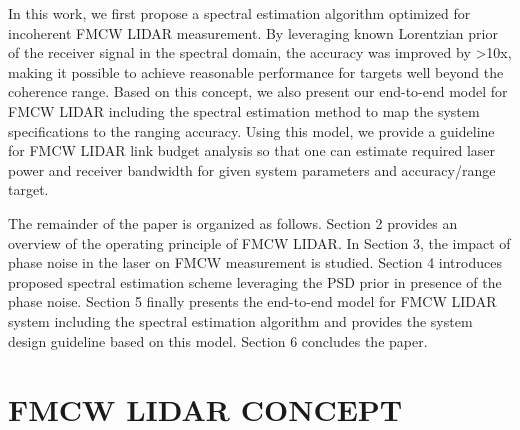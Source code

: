\documentclass{article}
\begin{document}



 
In this work, we first propose a spectral estimation algorithm optimized for incoherent FMCW LIDAR measurement. By leveraging known Lorentzian prior of the receiver signal in the spectral domain, the accuracy was improved by \textgreater 10x, making it possible to achieve reasonable performance for targets well beyond the coherence range. Based on this concept, we also present our end-to-end model for FMCW LIDAR including the spectral estimation method to map the system specifications to the ranging accuracy. Using this model, we provide a guideline for FMCW LIDAR link budget analysis so that one can estimate required laser power and receiver bandwidth for given system parameters and accuracy/range target.

The remainder of the paper is organized as follows. Section 2 provides an overview of the operating principle of FMCW LIDAR. In Section 3, the impact of phase noise in the laser on FMCW measurement is studied. Section 4 introduces proposed spectral estimation scheme leveraging the PSD prior in presence of the phase noise. Section 5 finally presents the end-to-end model for FMCW LIDAR system including the spectral estimation algorithm and provides the system design guideline based on this model. Section 6 concludes the paper.

\section{FMCW LIDAR CONCEPT}
\label{sec:fmcw}
\end{document}
